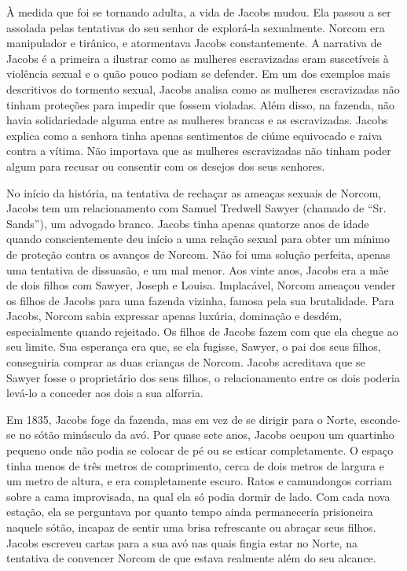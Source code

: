 À medida que foi se tornando adulta, a vida de Jacobs mudou. Ela passou
a ser assolada pelas tentativas do seu senhor de explorá-la sexualmente.
Norcom era manipulador e tirânico, e atormentava Jacobs constantemente.
A narrativa de Jacobs é a primeira a ilustrar como as mulheres
escravizadas eram suscetíveis à violência sexual e o quão pouco podiam
se defender. Em um dos exemplos mais descritivos do tormento sexual,
Jacobs analisa como as mulheres escravizadas não tinham proteções para
impedir que fossem violadas. Além disso, na fazenda, não havia
solidariedade alguma entre as mulheres brancas e as escravizadas. Jacobs
explica como a senhora tinha apenas sentimentos de ciúme equivocado e
raiva contra a vítima. Não importava que as mulheres escravizadas não
tinham poder algum para recusar ou consentir com os desejos dos seus
senhores.

No início da história, na tentativa de rechaçar as ameaças sexuais de
Norcom, Jacobs tem um relacionamento com Samuel Tredwell Sawyer (chamado
de ``Sr. Sands''), um advogado branco. Jacobs tinha apenas quatorze anos
de idade quando conscientemente deu início a uma relação sexual para
obter um mínimo de proteção contra os avanços de Norcom. Não foi uma
solução perfeita, apenas uma tentativa de dissuasão, e um mal menor. Aos
vinte anos, Jacobs era a mãe de dois filhos com Sawyer, Joseph e Louisa.
Implacável, Norcom ameaçou vender os filhos de Jacobs para uma fazenda
vizinha, famosa pela sua brutalidade. Para Jacobs, Norcom sabia
expressar apenas luxúria, dominação e desdém, especialmente quando
rejeitado. Os filhos de Jacobs fazem com que ela chegue ao seu limite.
Sua esperança era que, se ela fugisse, Sawyer, o pai dos seus filhos,
conseguiria comprar as duas crianças de Norcom. Jacobs acreditava que se
Sawyer fosse o proprietário dos seus filhos, o relacionamento entre os
dois poderia levá-lo a conceder aos dois a sua alforria.

Em 1835, Jacobs foge da fazenda, mas em vez de se dirigir para o Norte,
esconde-se no sótão minúsculo da avó. Por quase sete anos, Jacobs ocupou
um quartinho pequeno onde não podia se colocar de pé ou se esticar
completamente. O espaço tinha menos de três metros de comprimento, cerca
de dois metros de largura e um metro de altura, e era completamente
escuro. Ratos e camundongos corriam sobre a cama improvisada, na qual
ela só podia dormir de lado. Com cada nova estação, ela se perguntava
por quanto tempo ainda permaneceria prisioneira naquele sótão, incapaz
de sentir uma brisa refrescante ou abraçar seus filhos. Jacobs escreveu
cartas para a sua avó nas quais fingia estar no Norte, na tentativa de
convencer Norcom de que estava realmente além do seu alcance.

